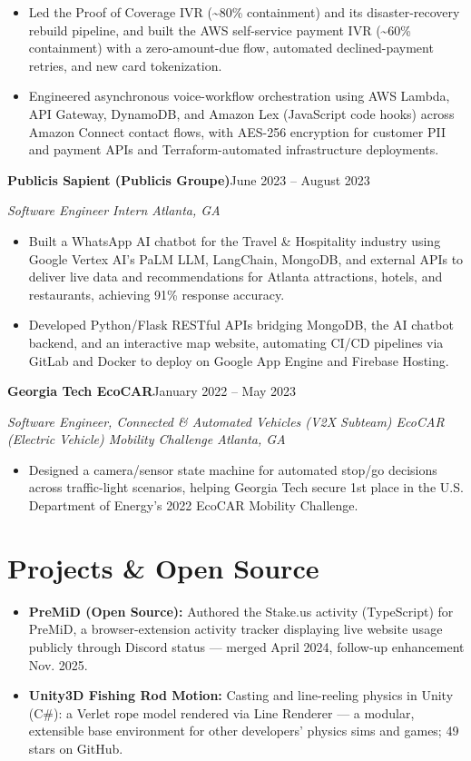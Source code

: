 \documentclass[10pt]{article}
\newcommand{\jobheader}[3]{%
  \noindent\textbf{#1}\hfill #2\par
  \noindent\textit{#3}\par\vspace{0pt}}
\begin{document}
\begin{itemize}
  \item Led the Proof of Coverage IVR (\textasciitilde80\% containment) and its disaster-recovery rebuild pipeline, and built the AWS self-service payment IVR (\textasciitilde60\% containment) with a zero-amount-due flow, automated declined-payment retries, and new card tokenization.
  \item Engineered asynchronous voice-workflow orchestration using AWS Lambda, API Gateway, DynamoDB, and Amazon Lex (JavaScript code hooks) across Amazon Connect contact flows, with AES-256 encryption for customer PII and payment APIs and Terraform-automated infrastructure deployments.
\end{itemize}

\vspace{1pt}
\jobheader{Publicis Sapient (Publicis Groupe)}{June 2023 -- August 2023}{Software Engineer Intern \textbar{} Atlanta, GA}
\begin{itemize}
  \item Built a WhatsApp AI chatbot for the Travel \& Hospitality industry using Google Vertex AI's PaLM LLM, LangChain, MongoDB, and external APIs to deliver live data and recommendations for Atlanta attractions, hotels, and restaurants, achieving 91\% response accuracy.
  \item Developed Python/Flask RESTful APIs bridging MongoDB, the AI chatbot backend, and an interactive map website, automating CI/CD pipelines via GitLab and Docker to deploy on Google App Engine and Firebase Hosting.
\end{itemize}

\vspace{1pt}
\jobheader{Georgia Tech EcoCAR}{January 2022 -- May 2023}{Software Engineer, Connected \& Automated Vehicles (V2X Subteam) \textbar{} EcoCAR (Electric Vehicle) Mobility Challenge \textbar{} Atlanta, GA}
\begin{itemize}
  \item Designed a camera/sensor state machine for automated stop/go decisions across traffic-light scenarios, helping Georgia Tech secure 1st place in the U.S. Department of Energy's 2022 EcoCAR Mobility Challenge.
\end{itemize}

\section{Projects \& Open Source}
\begin{itemize}
  \item \textbf{PreMiD (Open Source):} Authored the Stake.us activity (TypeScript) for PreMiD, a browser-extension activity tracker displaying live website usage publicly through Discord status — merged April 2024, follow-up enhancement Nov. 2025.
  \item \textbf{Unity3D Fishing Rod Motion:} Casting and line-reeling physics in Unity (C\#): a Verlet rope model rendered via Line Renderer — a modular, extensible base environment for other developers' physics sims and games; 49 stars on GitHub.
\end{itemize}
\end{document}
